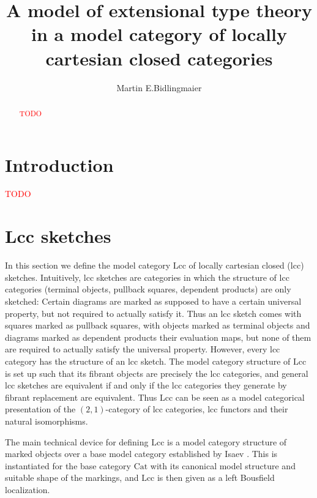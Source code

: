 \documentclass{article}
\newcommand{\todo}[1]{\textcolor{red}{#1}}
\begin{document}
\title{A model of extensional type theory in a model category of locally cartesian closed categories}

\author{Martin E.\@ Bidlingmaier}

\maketitle

\begin{abstract}
  \todo{TODO}
\end{abstract}

\section{Introduction}
\todo{TODO}

\section{Lcc sketches}
\label{sec:lcc-sketches}

In this section we define the model category $\mathrm{Lcc}$ of locally cartesian closed (lcc) sketches.
Intuitively, lcc sketches are categories in which the structure of lcc categories (terminal objects, pullback squares, dependent products) are only sketched:
Certain diagrams are marked as supposed to have a certain universal property, but not required to actually satisfy it.
Thus an lcc sketch comes with squares marked as pullback squares, with objects marked as terminal objects and diagrams marked as dependent products their evaluation maps, but none of them are required to actually satisfy the universal property.
However, every lcc category has the structure of an lcc sketch.
The model category structure of $\mathrm{Lcc}$ is set up such that its fibrant objects are precisely the lcc categories, and general lcc sketches are equivalent if and only if the lcc categories they generate by fibrant replacement are equivalent.
Thus $\mathrm{Lcc}$ can be seen as a model categorical presentation of the $(2, 1)$-category of lcc categories, lcc functors and their natural isomorphisms.

The main technical device for defining $\mathrm{Lcc}$ is a model category structure of marked objects over a base model category established by Isaev \cite{marked-objects}.
This is instantiated for the base category $\mathrm{Cat}$ with its canonical model structure and suitable shape of the markings, and $\mathrm{Lcc}$ is then given as a left Bousfield localization.
\end{document}
